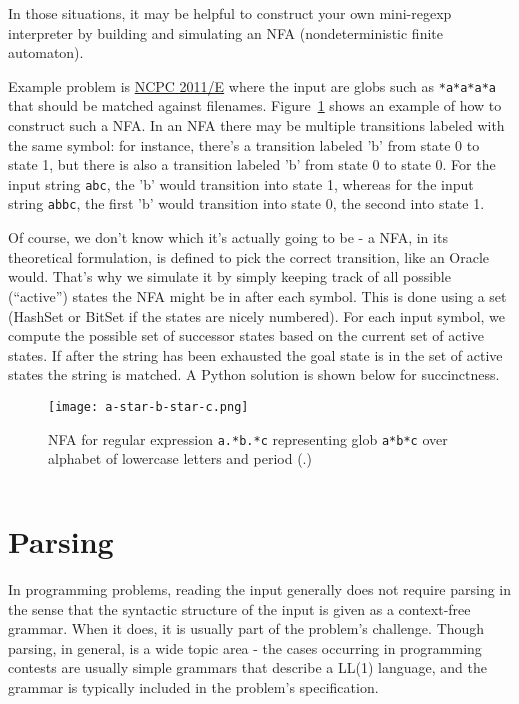 In those situations, it may be helpful to construct your own mini-regexp interpreter by building
and simulating an NFA (nondeterministic finite automaton).

Example problem is \href{http://ncpc.idi.ntnu.no/ncpc2011/ncpc2011problems.pdf}{NCPC 2011/E}
where the input are globs such as \texttt{*a*a*a*a} that should be matched against filenames.
Figure~\ref{fig:nfaexample} shows an example of how to construct such a NFA.
In an NFA there may be multiple transitions labeled with the same symbol: for instance,
there's a transition labeled 'b' from state 0 to state 1, but there is also a transition
labeled 'b' from state 0 to state 0.  For the input string \texttt{abc}, the 'b' would
transition into state 1, whereas for the input string \texttt{abbc}, the first 'b' would
transition into state 0, the second into state 1.

Of course, we don't know which it's actually going to be - a NFA, in its theoretical 
formulation, is defined to pick the correct transition, like an Oracle would.  That's why we simulate
it by simply keeping track of all possible (``active'') states the NFA might be in after each symbol.
This is done using a set (HashSet or BitSet if the states are nicely numbered).
For each input symbol, we compute the possible set of successor states based on the
current set of active states.  If after the string has been exhausted the goal state
is in the set of active states the string is matched.
A Python solution is shown below for succinctness.

\begin{figure}
    \centering
    \texttt{[image: a-star-b-star-c.png]}
    \caption{NFA for regular expression \texttt{a.*b.*c} representing glob \texttt{a*b*c}
        over alphabet of lowercase letters and period (.)}
    \label{fig:nfaexample}
\end{figure}

\inputminted[fontsize=\footnotesize,linenos=true]{python}{code/ls.py}

\section{Parsing}

In programming problems, reading the input generally does not require parsing in the sense that
the syntactic structure of the input is given as a context-free grammar.  When it does, it is
usually part of the problem's challenge.  Though parsing, in general, is a wide topic area - 
the cases occurring in programming contests are usually simple grammars that describe a LL(1)
language, and the grammar is typically included in the problem's specification.

